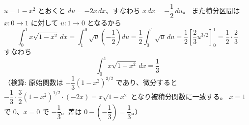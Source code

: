 
$u = 1 - x^{2}$ とおくと $du = -2x\,dx$、すなわち $x\,dx = -\dfrac{1}{2}\,du$。
また積分区間は $x: 0\to 1$ に対して $u: 1\to 0$ となるから
\[
\int_{0}^{1} x\sqrt{1-x^{2}}\,dx
= \int_{1}^{0} \sqrt{u}\left(-\frac{1}{2}\right)du
= \frac{1}{2}\int_{0}^{1} \sqrt{u}\,du
= \frac{1}{2}\left[\frac{2}{3}u^{3/2}\right]_{0}^{1}
= \frac{1}{2}\cdot\frac{2}{3}
\]
すなわち
\[
\boxed{\; \int_{0}^{1} x\sqrt{1-x^{2}}\,dx = \frac{1}{3} \;}
\]
（検算: 原始関数は $-\dfrac{1}{3}(1-x^{2})^{3/2}$ であり、微分すると
$-\dfrac{1}{3}\cdot\dfrac{3}{2}(1-x^{2})^{1/2}\cdot(-2x) = x\sqrt{1-x^{2}}$ となり被積分関数に一致する。
$x=1$ で $0$、$x=0$ で $-\dfrac13$。差は $0-\left(-\dfrac13\right)=\dfrac13$。）

